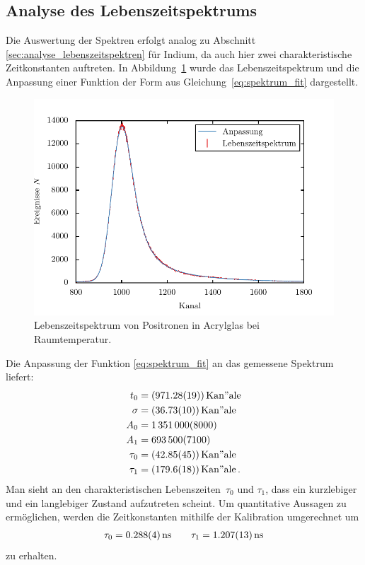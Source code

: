 \documentclass[11pt, a4paper]{article}
\numberwithin{equation}{section}
\begin{document}
\subsection{Analyse des Lebenszeitspektrums}
Die Auswertung der Spektren erfolgt analog zu Abschnitt \ref{sec:analyse_lebenszeitspektren} für Indium, da auch hier zwei charakteristische Zeitkonstanten auftreten.
In Abbildung~\ref{fig:spektrum_acrylglas} wurde das Lebenszeitspektrum und die Anpassung einer Funktion der Form aus Gleichung~\eqref{eq:spektrum_fit} dargestellt.
\begin{figure}[h]
	\centering
	\includegraphics{./figures/acryl_glas.pdf}
	\caption{Lebenszeitspektrum von Positronen in Acrylglas bei Raumtemperatur.}
	\label{fig:spektrum_acrylglas}
\end{figure}
Die Anpassung der Funktion \eqref{eq:spektrum_fit} an das gemessene Spektrum liefert:
\begin{align*}
	t_0 &= (\num{971.28 +- 0.19})\, \mathrm{Kan"ale}\\
	\sigma &= (\num{36.73 +- 0.10})\, \mathrm{Kan"ale}\\
	A_0 &= \num{1351000 +- 8000}\\
	A_1 &= \num{693500 +- 7100}\\
	\tau_0 &= (\num{42.85 +- 0.45})\, \mathrm{Kan"ale}\\
	\tau_1 &= (\num{179.6 +- 1.8})\, \mathrm{Kan"ale} \, \text{.}
\end{align*}
Man sieht an den charakteristischen Lebenszeiten~$\tau_0$ und $\tau_1$, dass ein kurzlebiger und ein langlebiger Zustand aufzutreten scheint.
Um quantitative Aussagen zu ermöglichen, werden die Zeitkonstanten mithilfe der Kalibration umgerechnet um
\begin{align*}
	\tau_0 = \SI{0.288 +- 0.004}{ns}\qquad
	\tau_1 = \SI{1.207 +- 0.013}{ns}
\end{align*}
zu erhalten.
\end{document}
